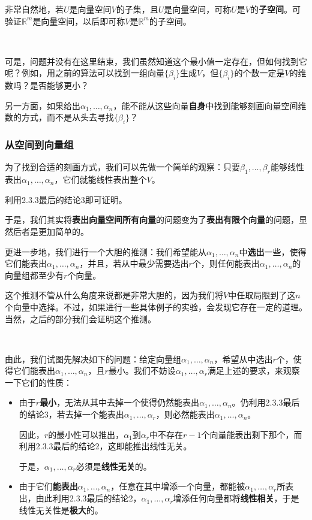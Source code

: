\documentclass[a4paper,UTF8,fontset=windows]{ctexart}
\newcommand*{\note}{\noindent *}
\begin{document}
\note 非常自然地，若$U$是向量空间$V$的子集，且$U$是向量空间，可称$U$是$V$的\textbf{子空间}。可验证$\mathbb{R}^m$是向量空间，以后即可称$V$是$\mathbb{R}^m$的子空间。

\

可是，问题并没有在这里结束，我们虽然知道这个最小值一定存在，但如何找到它呢？例如，用之前的算法可以找到一组向量$\{\beta_i\}$生成$V$，但$\{\beta_i\}$的个数一定是$V$的维数吗？是否能够更小？

另一方面，如果给出$\alpha_1,\dots,\alpha_n$，能不能从这些向量\textbf{自身}中找到能够刻画向量空间维数的方式，而不是从头去寻找$\{\beta_i\}$？

\subsubsection{从空间到向量组}
为了找到合适的刻画方式，我们可以先做一个简单的观察：只要$\beta_1,\dots,\beta_r$能够线性表出$\alpha_1,\dots,\alpha_n$，它们就能线性表出整个$V$。

\note 利用2.3.3最后的结论3即可证明。

于是，我们其实将\textbf{表出向量空间所有向量}的问题变为了\textbf{表出有限个向量}的问题，显然后者是更加简单的。

更进一步地，我们进行一个大胆的推测：我们希望能从$\alpha_1,\dots,\alpha_n$中\textbf{选出}一些，使得它们能表出$\alpha_1,\dots,\alpha_n$，并且，若从中最少需要选出$r$个，则任何能表出$\alpha_1,\dots,\alpha_n$的向量组都至少有$r$个向量。

\note 这个推测不管从什么角度来说都是非常大胆的，因为我们将$V$中任取局限到了这$n$个向量中选择。不过，如果进行一些具体例子的实验，会发现它存在一定的道理。当然，之后的部分我们会证明这个推测。

\

由此，我们试图先解决如下的问题：给定向量组$\alpha_1,\dots,\alpha_n$，希望从中选出$r$个，使得它们能表出$\alpha_1,\dots,\alpha_n$，且$r$最小。我们不妨设$\alpha_1,\dots,\alpha_r$满足上述的要求，来观察一下它们的性质：
\begin{itemize}
    \item 由于$r$\textbf{最小}，无法从其中去掉一个使得仍然能表出$\alpha_1,\dots,\alpha_n$。仍利用2.3.3最后的结论3，若去掉一个能表出$\alpha_1,\dots,\alpha_r$，则必然能表出$\alpha_1,\dots,\alpha_n$。
    
    因此，$r$的最小性可以推出，$\alpha_1$到$\alpha_r$中不存在$r-1$个向量能表出剩下那个，而利用2.3.3最后的结论2，这即能推出线性无关。

    于是，$\alpha_1,\dots,\alpha_r$必须是\textbf{线性无关}的。

    \item 由于它们\textbf{能表出}$\alpha_1,\dots,\alpha_n$，任意在其中增添一个向量，都能被$\alpha_1,\dots,\alpha_r$所表出，由此利用2.3.3最后的结论2，$\alpha_1,\dots,\alpha_r$增添任何向量都将\textbf{线性相关}，于是线性无关性是\textbf{极大}的。
\end{itemize}
\end{document}
